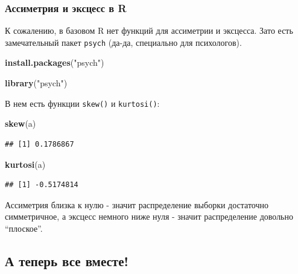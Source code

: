 \documentclass[]{book}
\newenvironment{Shaded}{\begin{snugshade}}{\end{snugshade}}
\newcommand{\KeywordTok}[1]{\textcolor[rgb]{0.13,0.29,0.53}{\textbf{#1}}}
\newcommand{\StringTok}[1]{\textcolor[rgb]{0.31,0.60,0.02}{#1}}
\newcommand{\NormalTok}[1]{#1}
\begin{document}
\subsubsection{Ассиметрия и эксцесс в R}\label{skewR}

К сожалению, в базовом R нет функций для ассиметрии и эксцесса. Зато
есть замечательный пакет \texttt{psych} (да-да, специально для
психологов).

\begin{Shaded}
\begin{Highlighting}[]
\KeywordTok{install.packages}\NormalTok{(}\StringTok{"psych"}\NormalTok{)}
\end{Highlighting}
\end{Shaded}

\begin{Shaded}
\begin{Highlighting}[]
\KeywordTok{library}\NormalTok{(}\StringTok{"psych"}\NormalTok{)}
\end{Highlighting}
\end{Shaded}

В нем есть функции \texttt{skew()} и \texttt{kurtosi()}:

\begin{Shaded}
\begin{Highlighting}[]
\KeywordTok{skew}\NormalTok{(a)}
\end{Highlighting}
\end{Shaded}

\begin{verbatim}
## [1] 0.1786867
\end{verbatim}

\begin{Shaded}
\begin{Highlighting}[]
\KeywordTok{kurtosi}\NormalTok{(a)}
\end{Highlighting}
\end{Shaded}

\begin{verbatim}
## [1] -0.5174814
\end{verbatim}

Ассиметрия близка к нулю - значит распределение выборки достаточно
симметричное, а эксцесс немного ниже нуля - значит распределение
довольно ``плоское''.

\subsection{А теперь все вместе!}\label{summary}
\end{document}
